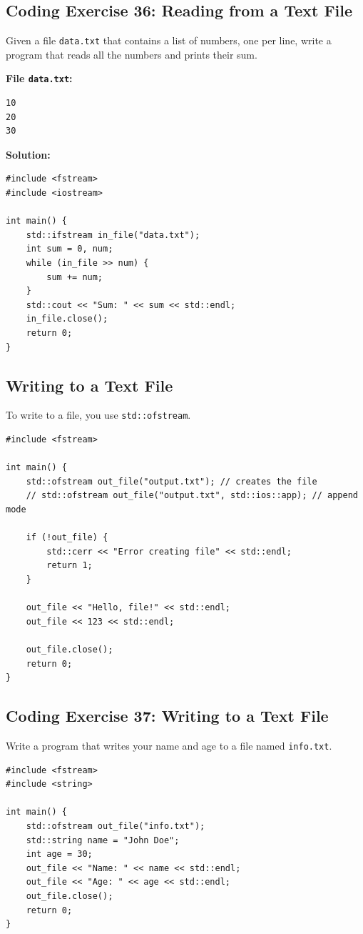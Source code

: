 \subsection{Coding Exercise 36: Reading from a Text File}
Given a file \texttt{data.txt} that contains a list of numbers, one per line, write a program that reads all the numbers and prints their sum.

\textbf{File \texttt{data.txt}:}
\begin{lstlisting}[numbers=none]
10
20
30
\end{lstlisting}
\textbf{Solution:}
\begin{lstlisting}
#include <fstream>
#include <iostream>

int main() {
	std::ifstream in_file("data.txt");
	int sum = 0, num;
	while (in_file >> num) {
		sum += num;
	}
	std::cout << "Sum: " << sum << std::endl;
	in_file.close();
	return 0;
}
\end{lstlisting}

\subsection{Writing to a Text File}
To write to a file, you use \texttt{std::ofstream}.
\begin{lstlisting}
#include <fstream>

int main() {
	std::ofstream out_file("output.txt"); // creates the file
	// std::ofstream out_file("output.txt", std::ios::app); // append mode

	if (!out_file) {
		std::cerr << "Error creating file" << std::endl;
		return 1;
	}

	out_file << "Hello, file!" << std::endl;
	out_file << 123 << std::endl;

	out_file.close();
	return 0;
}
\end{lstlisting}

\subsection{Coding Exercise 37: Writing to a Text File}
Write a program that writes your name and age to a file named \texttt{info.txt}.
\begin{lstlisting}
#include <fstream>
#include <string>

int main() {
	std::ofstream out_file("info.txt");
	std::string name = "John Doe";
	int age = 30;
	out_file << "Name: " << name << std::endl;
	out_file << "Age: " << age << std::endl;
	out_file.close();
	return 0;
}
\end{lstlisting}

